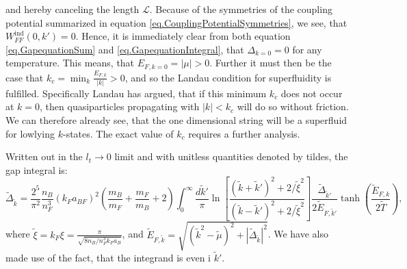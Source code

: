and hereby canceling the length $\mathcal{L}$. Because of the symmetries of the coupling potential summarized in equation \eqref{eq.CouplingPotentialSymmetries}, we see, that $W^\text{ind}_{FF}(0,k') = 0$. Hence, it is immediately clear from both equation \eqref{eq.GapequationSum} and \eqref{eq.GapequationIntegral}, that $\Delta_{k=0} = 0$ for any temperature. This means, that $E_{F,k=0} = |\mu| > 0$. Further it must then be the case that $k_c = \min_k \frac{E_{F,k}}{|k|} > 0$, and so the Landau condition for superfluidity is fulfilled\cite{LandauStatPhys2,PlischkeStatPhys}.
Specifically Landau has argued, that if this minimum $k_c$ does not occur at $k=0$, then quasiparticles propagating with $|k|< k_c$ will do so without friction. We can therefore already see, that the one dimensional string will be a superfluid for lowlying $k$-states. The exact value of $k_c$ requires a further analysis. 

Written out in the $l_t \to 0$ limit and with unitless quantities denoted by tildes, the gap integral is:
\begin{equation}
\tilde{\Delta}_{\tilde{k}} = \frac{2^5}{\pi^2}\frac{n_B}{n_F^3}(k_Fa_{BF})^2\left(\frac{m_B}{m_F} + \frac{m_F}{m_B} + 2\right) \int_0^\infty \frac{d\tilde{k}'}{\pi} \ln\left[\frac{(\tilde{k}+\tilde{k}')^2+2/\tilde{\xi}^2}{(\tilde{k}-\tilde{k}')^2+2/\tilde{\xi}^2}\right] \frac{\tilde{\Delta}_{\tilde{k}'}}{2\tilde{E}_{F,\tilde{k}'}}\tanh\left(\frac{\tilde{E}_{F,k}}{2\tilde{T}}\right),
\label{eq.GapequationIntegralUnitless}
\end{equation} 
where $\tilde{\xi} = k_F\xi = \frac{\pi}{\sqrt{8 n_B/n_F^3 k_Fa_B}}$, and $\tilde{E}_{F,\tilde{k}} = \sqrt{(\tilde{k}^2-\tilde{\mu})^2 + |\tilde{\Delta}_{\tilde{k}}|^2}$. We have also made use of the fact, that the integrand is even i $\tilde{k}'$.

